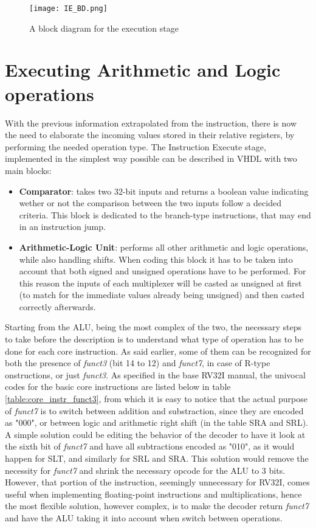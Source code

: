 \begin{figure}[!h]
    \centering
    \texttt{[image: IE\_BD.png]}
    \caption{A block diagram for the execution stage}
    \label{fig:IE_BD}
\end{figure}
\section{Executing Arithmetic and Logic operations}
With the previous information extrapolated from the instruction, there is now the need to elaborate the incoming values stored in their relative registers, by performing the needed operation type.
The Instruction Execute stage, implemented in the simplest way possible can be described in VHDL with two main blocks:
\begin{itemize}
\item \textbf{Comparator}: takes two 32-bit inputs and returns a boolean value indicating wether or not the comparison between the two inputs follow a decided criteria. This block is dedicated to the branch-type instructions, that may end in an instruction jump.
\item \textbf{Arithmetic-Logic Unit}: performs all other arithmetic and logic operations, while also handling shifts. When coding this block it has to be taken into account that both signed and unsigned operations have to be performed. For this reason the inputs of each multiplexer will be casted as unsigned at first (to match for the immediate values already being unsigned) and then casted correctly afterwards. 
\end{itemize}
Starting from the ALU, being the most complex of the two, the necessary steps to take before the description is to understand what type of operation has to be done for each core instruction. As said earlier, some of them can be recognized for both the presence of \emph{funct3} (bit 14 to 12) and \emph{funct7}, in case of R-type onstructions, or just \emph{funct3}. As specified in the base RV32I manual, the univocal codes for the basic core instructions are listed below in table \ref{table:core_instr_funct3}, from which it is easy to notice that the actual purpose of \emph{funct7} is to switch between addition and substraction, since they are encoded as "000", or between logic and arithmetic right shift (in the table SRA and SRL). A simple solution could be editing the behavior of the decoder to have it look at the sixth bit of \emph{funct7} and have all subtractions encoded as "010", as it would happen for SLT, and similarly for SRL and SRA. This solution would remove the necessity for \emph{funct7} and shrink the necessary opcode for the ALU to 3 bits. However, that portion of the instruction, seemingly unnecessary for RV32I, comes useful when implementing floating-point instructions and multiplications, hence the most flexible solution, however complex, is to make the decoder return \emph{funct7} and have the ALU taking it into account when switch between operations.
